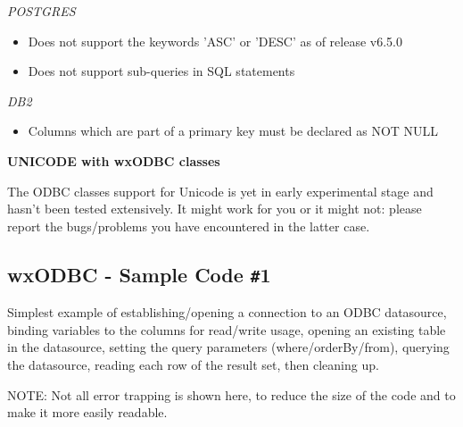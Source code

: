 {\it POSTGRES}
\begin{itemize}\itemsep=0pt
\item Does not support the keywords 'ASC' or 'DESC' as of release v6.5.0
\item Does not support sub-queries in SQL statements
\end{itemize}

{\it DB2}
\begin{itemize}\itemsep=0pt
\item Columns which are part of a primary key must be declared as NOT NULL
\end{itemize}

{\bf UNICODE with wxODBC classes}

The ODBC classes support for Unicode is yet in early experimental stage and
hasn't been tested extensively. It might work for you or it might not: please
report the bugs/problems you have encountered in the latter case.

\subsection{wxODBC - Sample Code {\tt\#}1}\label{wxodbcsamplecode1}

Simplest example of establishing/opening a connection to an ODBC datasource, 
binding variables to the columns for read/write usage, opening an 
existing table in the datasource, setting the query parameters 
(where/orderBy/from), querying the datasource, reading each row of the 
result set, then cleaning up.

NOTE: Not all error trapping is shown here, to reduce the size of the 
code and to make it more easily readable.

